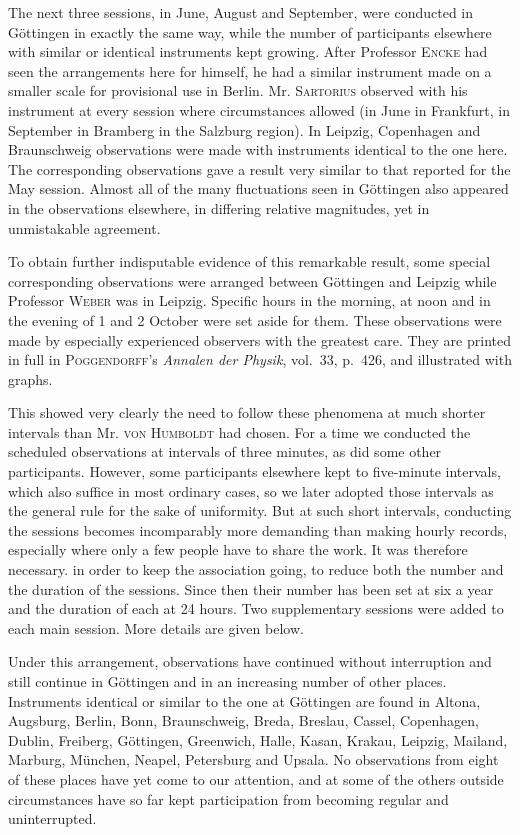 The next three sessions, in June, August and September, were conducted in Göttingen in exactly the same way, while the number of participants elsewhere with similar or identical instruments kept growing. After Professor \textsc{Encke} had seen the arrangements here for himself, he had a similar instrument made on a smaller scale for provisional use in Berlin. Mr. \textsc{Sartorius} observed with his instrument at every session where circumstances allowed (in June in Frankfurt, in September in Bramberg in the Salzburg region). In Leipzig, Copenhagen and Braunschweig observations were made with instruments identical to the one here. The corresponding observations gave a result very similar to that reported for the May session. Almost all of the many fluctuations seen in Göttingen also appeared in the observations elsewhere, in differing relative magnitudes, yet in unmistakable agreement.

To obtain further indisputable evidence of this remarkable result, some special corresponding observations were arranged between Göttingen and Leipzig while Professor \textsc{Weber} was in Leipzig. Specific hours in the morning, at noon and in the evening of 1 and 2 October were set aside for them. These observations were made by especially experienced observers with the greatest care. They are printed in full in \textsc{Poggendorff}'s \textit{Annalen der Physik}, vol.~33, p.~426, and illustrated with graphs.

This showed very clearly the need to follow these phenomena at much shorter intervals than Mr. \textsc{von Humboldt} had chosen. For a time we conducted the scheduled observations at intervals of three minutes, as did some other participants. However, some participants elsewhere kept to five-minute intervals, which also suffice in most ordinary cases, so we later adopted those intervals as the general rule for the sake of uniformity. But at such short intervals, conducting the sessions becomes incomparably more demanding than making hourly records, especially where only a few people have to share the work. It was therefore necessary. in order to keep the association going, to reduce both the number and the duration of the sessions. Since then their number has been set at six a year and the duration of each at 24 hours. Two supplementary sessions were added to each main session. More details are given below.

Under this arrangement, observations have continued without interruption and still continue in Göttingen and in an increasing number of other places. Instruments identical or similar to the one at Göttingen are found in Altona, Augsburg, Berlin, Bonn, Braunschweig, Breda, Breslau, Cassel, Copenhagen, Dublin, Freiberg, Göttingen, Greenwich, Halle, Kasan, Krakau, Leipzig, Mailand, Marburg, München, Neapel, Petersburg and Upsala. No observations from eight of these places have yet come to our attention, and at some of the others outside circumstances have so far kept participation from becoming regular and uninterrupted.

